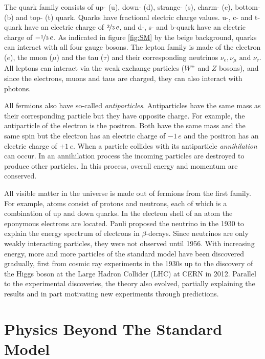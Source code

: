 \documentclass[a4paper,11pt,twosided,final,german,openbib,pdftex,listof=totoc,bibliography=totoc]{scrbook}
\begin{document}
The quark family consists of up- (u), down- (d), strange- (s), charm- (c), bottom- (b) and top- (t) quark. Quarks have fractional electric charge values. u-, c- and t-quark have an electric charge of $\nicefrac{2}{3} \,e$, and d-, s- and b-quark have an electric charge of $-\nicefrac{1}{3} \,e$. As indicated in figure \ref{fig:SM} by the beige background, quarks can interact with all four gauge bosons.
The lepton family is made of the electron ($e$), the muon ($\mu$) and the tau ($\tau$) and their corresponding neutrinos $\nu_e,\nu_{\mu} \textrm{ and } \nu_{\tau}$. All leptons can interact via the weak exchange particles ($W^{\pm}$ and $Z$ bosons), and since the electrons, muons and taus are charged, they can also interact with photons.

All fermions also have so-called \textit{antiparticles}. Antiparticles have the same mass as their corresponding particle but they have opposite charge. For example, the antiparticle of the electron is the positron. Both have the same mass and the same spin but the electron has an electric charge of $-1\,e$ and the positron has an electric charge of $+1\,e$. When a particle collides with its antiparticle \textit{annihilation} can occur. In an annihilation process the incoming particles are destroyed to produce other particles. In this process, overall energy and momentum are conserved.
\newline


All visible matter in the universe is made out of fermions from the first family. For example, atoms consist of protons and neutrons, each of which is a combination of up and down quarks. In the electron shell of an atom the eponymous electrons are located. Pauli proposed the neutrino in the 1930 to explain the energy spectrum of electrons in $\beta$-decays. Since neutrinos are only weakly interacting particles, they were not observed until 1956.\cite{REINES19941} With increasing energy, more and more particles of the standard model have been discovered gradually, first from cosmic ray experiments in the 1930s up to the discovery of the Higgs boson at the Large Hadron Collider (LHC) at CERN in 2012. Parallel to the experimental discoveries, the theory also evolved, partially explaining the results and in part motivating new experiments through predictions.


\section{Physics Beyond The Standard Model}
\end{document}
